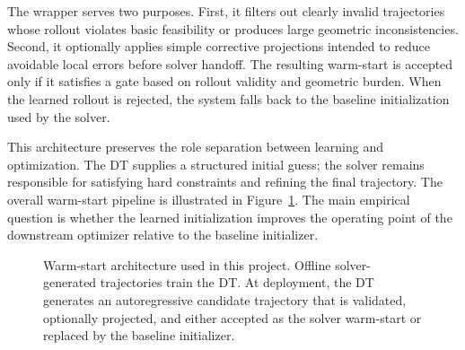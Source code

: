 The wrapper serves two purposes. First, it filters out clearly invalid trajectories whose rollout violates basic feasibility or produces large geometric inconsistencies. Second, it optionally applies simple corrective projections intended to reduce avoidable local errors before solver handoff. The resulting warm-start is accepted only if it satisfies a gate based on rollout validity and geometric burden. When the learned rollout is rejected, the system falls back to the baseline initialization used by the solver.

This architecture preserves the role separation between learning and optimization. The DT supplies a structured initial guess; the solver remains responsible for satisfying hard constraints and refining the final trajectory. The overall warm-start pipeline is illustrated in Figure~\ref{fig:architecture}. The main empirical question is whether the learned initialization improves the operating point of the downstream optimizer relative to the baseline initializer.

\begin{figure}[t]
    \centering
    \caption{Warm-start architecture used in this project. Offline solver-generated trajectories train the DT. At deployment, the DT generates an autoregressive candidate trajectory that is validated, optionally projected, and either accepted as the solver warm-start or replaced by the baseline initializer.}
    \label{fig:architecture}
\end{figure}

